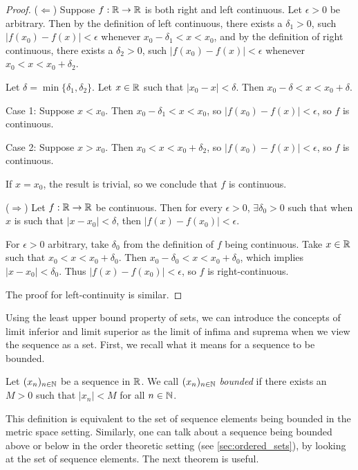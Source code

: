 \documentclass{article}
\begin{document}
\begin{proof}
($\Leftarrow$) Suppose $f:{\mathbb{R}} \to {\mathbb{R}}$ is both right and left continuous. Let $\epsilon > 0$ be arbitrary. Then by the definition of left continuous, there exists a $\delta_1>0$, such $\vert f(x_0)-f(x)\vert<\epsilon$ whenever $ x_0-\delta_1 <x<x_0$, and by the definition of right continuous, there exists a $\delta_2>0$, such $\vert f(x_0)-f(x)\vert<\epsilon$ whenever $x_0<x<x_0+\delta_2$.

Let $\delta = \min\{\delta_1,\delta_2\}$. Let $x \in {\mathbb{R}}$ such that $\vert x_0-x\vert <\delta$. Then $x_0- \delta < x < x_0 + \delta$. 

Case 1: Suppose $x < x_0$. Then $x_0- \delta_1 < x <x_0$, so $\vert f(x_0)-f(x)\vert<\epsilon$, so $f$ is continuous.

Case 2: Suppose $x > x_0$. Then $x_0 < x < x_0 + \delta_2$, so $\vert f(x_0)-f(x)\vert<\epsilon$, so $f$ is continuous.

If $x=x_0$, the result is trivial, so we conclude that $f$ is continuous.

($\Rightarrow$) Let $f:{\mathbb{R}} \to {\mathbb{R}}$ be continuous. Then for every $\epsilon >0$, $\exists \delta_0 > 0$ such that when $x$ is such that $|x - x_0| < \delta$, then $|f(x) - f(x_0)| < \epsilon$.

For $\epsilon > 0$ arbitrary, take $\delta_0$ from the definition of $f$ being continuous.  Take $x \in {\mathbb{R}}$ such that $x_0 < x < x_0 + \delta_0 $. Then $x_0 - \delta_0 < x < x_0 + \delta_0 $, which implies $|x - x_0| < \delta_0 $. Thus  $|f(x) - f(x_0)| < \epsilon$, so $f$ is right-continuous.

The proof for left-continuity is similar. 
\end{proof}

Using the least upper bound property of sets, we can introduce the concepts of limit inferior and limit superior as the limit of infima and suprema when we view the sequence as a set. First, we recall what it means for a sequence to be bounded.

\begin{definition}
Let $(x_n)_{n\in {\mathbb{N}}}$ be a sequence in ${\mathbb{R}}$. We call $(x_n)_{n\in {\mathbb{N}}}$ \emph{bounded} if there exists an $M > 0$ such that $\vert x_n\vert<M$ for all $n\in {\mathbb{N}}$.
\end{definition}

This definition is equivalent to the set of sequence elements being bounded in the metric space setting. Similarly, one can talk about a sequence being bounded above or below in the order theoretic setting (see \cref{sec:ordered_sets}), by looking at the set of sequence elements. The next theorem is useful.
\end{document}
